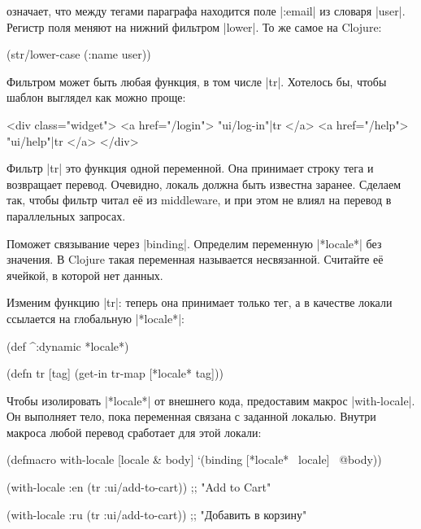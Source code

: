 \noindent
означает, что между тегами параграфа находится поле \spverb|:email| из словаря
\spverb|user|. Регистр поля меняют на нижний фильтром \spverb|lower|. То же
самое на Clojure:

\begin{english}
  \begin{clojure}
(str/lower-case (:name user))
  \end{clojure}
\end{english}

Фильтром может быть любая функция, в том числе \spverb|tr|. Хотелось бы,
чтобы шаблон выглядел как можно проще:

\begin{english}
  \begin{htmldjango}
<div class="widget">
  <a href="/login">{{ "ui/log-in"|tr }}</a>
  <a href="/help">{{ "ui/help"|tr }}</a>
</div>
  \end{htmldjango}
\end{english}

Фильтр \spverb|tr| это функция одной переменной. Она принимает строку тега и
возвращает перевод. Очевидно, локаль должна быть известна заранее. Сделаем так,
чтобы фильтр читал е\"{е} из middleware, и при этом не влиял на перевод в параллельных
запросах.

Поможет связывание через \spverb|binding|. Определим переменную
\spverb|*locale*| без значения. В Clojure такая переменная называется
несвязанной. Считайте е\"{е} ячейкой, в которой нет данных.

Изменим функцию \spverb|tr|: теперь она принимает только тег, а в качестве
локали ссылается на глобальную \spverb|*locale*|:

\begin{english}
  \begin{clojure}
(def ^:dynamic *locale*)

(defn tr [tag]
  (get-in tr-map [*locale* tag]))
  \end{clojure}
\end{english}


Чтобы изолировать \spverb|*locale*| от внешнего кода, предоставим макрос
\spverb|with-locale|. Он выполняет тело, пока переменная связана с заданной
локалью. Внутри макроса любой перевод сработает для этой локали:

  \begin{clojure}
(defmacro with-locale
  [locale & body]
  `(binding [*locale* ~locale]
     ~@body))

(with-locale :en
  (tr :ui/add-to-cart))
;; "Add to Cart"

(with-locale :ru
  (tr :ui/add-to-cart))
;; "Добавить в корзину"
  \end{clojure}

